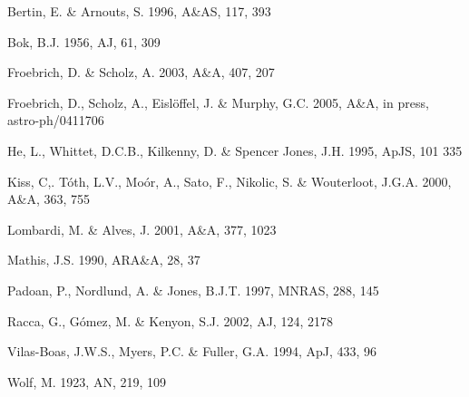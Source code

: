 \documentclass{aa}
\begin{document}
\begin{thebibliography}{}

Bertin, E. \& Arnouts, S. 1996, A\&AS, 117, 393

Bok, B.J. 1956, AJ, 61, 309 

Froebrich, D. \& Scholz, A. 2003, A\&A, 407, 207

Froebrich, D., Scholz, A., Eisl\"offel, J. \& Murphy, G.C. 2005, A\&A, in press, astro-ph/0411706

He, L., Whittet, D.C.B., Kilkenny, D. \& Spencer Jones, J.H. 1995, ApJS, 101 335

Kiss, C,. T\'oth, L.V., Mo\'or, A., Sato, F., Nikolic, S. \& Wouterloot, J.G.A. 2000, A\&A, 363, 755

Lombardi, M. \& Alves, J. 2001, A\&A, 377, 1023

Mathis, J.S. 1990, ARA\&A, 28, 37

Padoan, P., Nordlund, A. \& Jones, B.J.T. 1997, MNRAS, 288, 145 

Racca, G., G\'omez, M. \& Kenyon, S.J. 2002, AJ, 124, 2178

Vilas-Boas, J.W.S., Myers, P.C. \& Fuller, G.A. 1994, ApJ, 433, 96

Wolf, M. 1923, AN, 219, 109 
\end{thebibliography}
\end{document}

